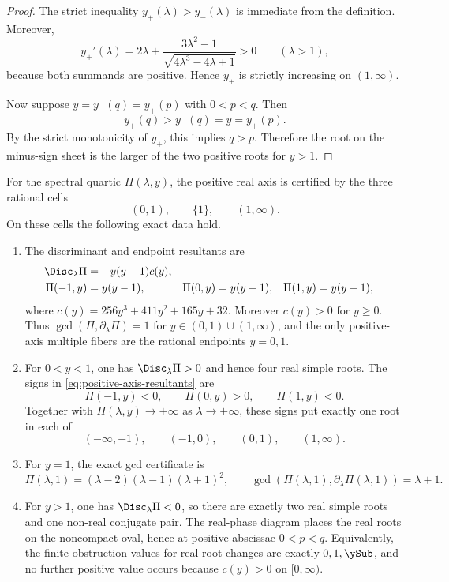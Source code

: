 \begin{proof}
The strict inequality \(y_+(\lambda)>y_-(\lambda)\) is immediate from the definition.
Moreover,
\[
y_+'(\lambda)=2\lambda+\frac{3\lambda^2-1}{\sqrt{4\lambda^3-4\lambda+1}}>0
\qquad (\lambda>1),
\]
because both summands are positive.
Hence \(y_+\) is strictly increasing on \((1,\infty)\).

Now suppose \(y=y_-(q)=y_+(p)\) with \(0<p<q\).
Then
\[
y_+(q)>y_-(q)=y=y_+(p).
\]
By the strict monotonicity of \(y_+\), this implies \(q>p\).
Therefore the root on the minus-sign sheet is the larger of the two positive roots for \(y>1\).
\end{proof}


\begin{lemma}\label{lem:finite-interval-certificates}
For the spectral quartic \(\Pi(\lambda,y)\), the positive real axis is certified by the three rational cells
\[
(0,1),\qquad \{1\},\qquad (1,\infty).
\]
On these cells the following exact data hold.
\begin{enumerate}
\item The discriminant and endpoint resultants are
\begin{align}
\Disc_\lambda \Pi
&=-y(y-1)c(y),\label{eq:positive-axis-discriminant}\\
\Pi(-1,y)&=y(y-1),
&\Pi(0,y)&=y(y+1),
&\Pi(1,y)&=y(y-1),\label{eq:positive-axis-resultants}
\end{align}
where \(c(y)=256y^3+411y^2+165y+32\).
Moreover \(c(y)>0\) for \(y\ge0\).
Thus \(\gcd(\Pi,\partial_\lambda\Pi)=1\) for \(y\in(0,1)\cup(1,\infty)\), and the only positive-axis multiple fibers are the rational endpoints \(y=0,1\).
\item For \(0<y<1\), one has \(\Disc_\lambda\Pi>0\) and hence four real simple roots.  The signs in \eqref{eq:positive-axis-resultants} are
\[
\Pi(-1,y)<0,
\qquad
\Pi(0,y)>0,
\qquad
\Pi(1,y)<0.
\]
Together with \(\Pi(\lambda,y)\to+\infty\) as \(\lambda\to\pm\infty\), these signs put exactly one root in each of
\begin{equation}\label{eq:positive-axis-root-boxes}
(-\infty,-1),
\qquad
(-1,0),
\qquad
(0,1),
\qquad
(1,\infty).
\end{equation}
\item For \(y=1\), the exact gcd certificate is
\[
\Pi(\lambda,1)=(\lambda-2)(\lambda-1)(\lambda+1)^2,
\qquad
\gcd(\Pi(\lambda,1),\partial_\lambda\Pi(\lambda,1))=\lambda+1.
\]
\item For \(y>1\), one has \(\Disc_\lambda\Pi<0\), so there are exactly two real simple roots and one non-real conjugate pair.  The real-phase diagram places the real roots on the noncompact oval, hence at positive abscissae \(0<p<q\).  Equivalently, the finite obstruction values for real-root changes are exactly \(0,1,\ySub\), and no further positive value occurs because \(c(y)>0\) on \([0,\infty)\).

\end{enumerate}
\end{lemma}
